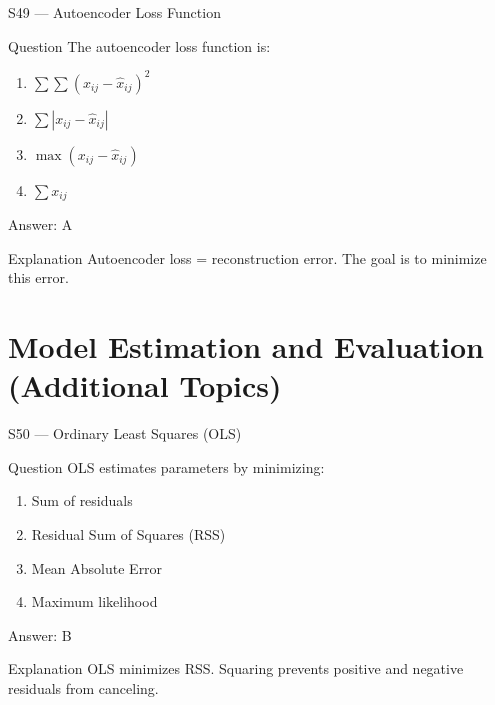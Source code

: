 \documentclass[aspectratio=169,8pt]{beamer}
\begin{document}
	\begin{frame}{S49 --- Autoencoder Loss Function}
		\begin{block}{Question}
			The autoencoder loss function is:
			\begin{enumerate}
				\item $\sum \sum (x_{ij} - \hat{x}_{ij})^2$
				\item $\sum |x_{ij} - \hat{x}_{ij}|$
				\item $\max(x_{ij} - \hat{x}_{ij})$
				\item $\sum x_{ij}$
			\end{enumerate}
		\end{block}
		\begin{exampleblock}{Answer: A}\end{exampleblock}
		\begin{block}{Explanation}
			Autoencoder loss = reconstruction error. The goal is to minimize this error.
		\end{block}
	\end{frame}
	
	\section{Model Estimation and Evaluation (Additional Topics)}
	
	\begin{frame}{S50 --- Ordinary Least Squares (OLS)}
		\begin{block}{Question}
			OLS estimates parameters by minimizing:
			\begin{enumerate}
				\item Sum of residuals
				\item Residual Sum of Squares (RSS)
				\item Mean Absolute Error
				\item Maximum likelihood
			\end{enumerate}
		\end{block}
		\begin{exampleblock}{Answer: B}\end{exampleblock}
		\begin{block}{Explanation}
			OLS minimizes RSS. Squaring prevents positive and negative residuals from canceling.
		\end{block}
	\end{frame}
	
\end{document}
